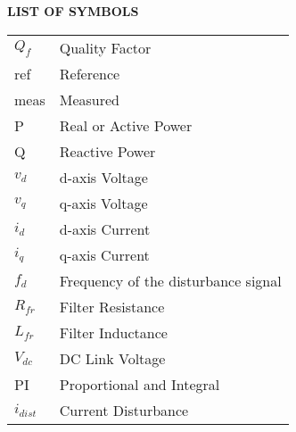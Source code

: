 \begin{center}
\fontsize{14pt}{14pt}\selectfont\bfseries {LIST OF SYMBOLS}
\end{center}
\bigskip
\begin{normalsize}
 \begin{table}[hbtp]
\renewcommand{\arraystretch}{1.5}
\begin{tabular}{p{} p{}}
$Q_{f}$ & Quality Factor\\
ref & Reference \\
meas & Measured \\
P & Real or Active Power\\
Q & Reactive Power \\
$v_{d}$  & d-axis Voltage \\
$v_{q}$  & q-axis Voltage \\
$i_{d}$  & d-axis Current \\
$i_{q}$  & q-axis Current \\
$f_{d}$  & Frequency of the disturbance signal \\
$R_{fr}$  & Filter Resistance \\
$L_{fr}$  & Filter Inductance \\
$V_{dc}$  & DC Link Voltage \\
PI & Proportional and Integral\\
$i_{dist}$  & Current Disturbance \\
\end{tabular}
\end{table}
\end{normalsize}